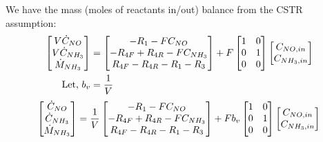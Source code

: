 We have the mass (moles of reactants in/out) balance from the CSTR assumption:
\begin{align*}
    \begin{bmatrix} V \dot C_{NO}\\ V \dot C_{NH_3} \\ \dot M_{NH_3}  \end{bmatrix} &=
    \begin{bmatrix} 
        -R_1 - F C_{NO}\\
        -R_{4F} + R_{4R} - F C_{NH_3}\\
        R_{4F} - R_{4R} - R_1 - R_3
     \end{bmatrix} +
    F \begin{bmatrix} 1 & 0 \\ 0 & 1 \\ 0 & 0 \end{bmatrix} \begin{bmatrix}  C_{NO, in} \\ C_{NH_3, in} \end{bmatrix}\\
    \text{Let, } b_v &= \frac{1}{V}\\
\end{align*}
\begin{equation} \label{eqn::mass_balance}
    \begin{bmatrix} \dot C_{NO} \\  \dot C_{NH_3} \\ \dot M_{NH_3}  \end{bmatrix} = \frac{1}{V}
    \begin{bmatrix} 
        -R_1 - F C_{NO}\\
        -R_{4F} + R_{4R} - F C_{NH_3}\\
        R_{4F} - R_{4R} - R_1 - R_3
     \end{bmatrix} +
    Fb_v \begin{bmatrix} 1 & 0 \\ 0 & 1 \\ 0 & 0 \end{bmatrix} \begin{bmatrix}  C_{NO, in} \\ C_{NH_3, in} \end{bmatrix}\\
\end{equation}






